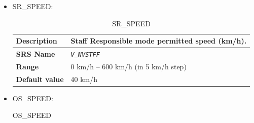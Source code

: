 \documentclass{template/openetcs}
\begin{document}
\begin{itemize}
\begin{longtable}{|l|l|}
				\hline
				
			\end{longtable}
			
			
		\item SR\_SPEED:
			\begin{longtable}{|l|l|}
				\caption{SR\_SPEED}\\ 							
				\hline
				
					\begin{minipage}[t]{0.22\linewidth} \textbf{Description}	\end{minipage} 
				&	\begin{minipage}[t]{0.78\linewidth} Staff Responsible mode permitted speed (km/h). \end{minipage} \\
				
				\hline
				
					\begin{minipage}[t]{0.22\linewidth} \textbf{SRS Name}	\end{minipage} 
				&	\begin{minipage}[t]{0.78\linewidth} \emph{\texttt{V\_NVSTFF}} \end{minipage} \\
				
				\hline
														
					\begin{minipage}[t]{0.22\linewidth} \textbf{Range}	\end{minipage} 
				&	\begin{minipage}[t]{0.78\linewidth} 0 km/h – 600 km/h (in 5 km/h step) \end{minipage} \\
				
				\hline
										
					\begin{minipage}[t]{0.22\linewidth} \textbf{Default value}	\end{minipage} 
				&	\begin{minipage}[t]{0.78\linewidth} 40 km/h \end{minipage} \\
				
				\hline
				
			\end{longtable}
			
			
		\item OS\_SPEED:
		
			\begin{longtable}{|l|l|}
				\caption{OS\_SPEED}\\ 							
				\hline
				

\end{longtable}
\end{itemize}
\end{document}
